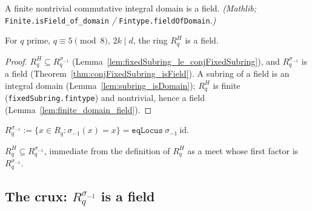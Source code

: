 \begin{lemma}\label{lem:finite_domain_field}
A finite nontrivial commutative integral domain is a field. \emph{(Mathlib;}
\texttt{Finite.isField\_of\_domain} \emph{/} \texttt{Fintype.fieldOfDomain}.\emph{)}
\end{lemma}

\begin{theorem}[$R_q^H$ is a field]\label{thm:fixedSubring_isField}
\leanok
{}
For $q$ prime, $q \equiv 5 \pmod 8$, $2k \mid d$, the ring $R_q^H$ is a field.
\end{theorem}

\begin{proof}
\leanok{}
$R_q^H \subseteq R_q^{\sigma_{-1}}$ (Lemma~\ref{lem:fixedSubring_le_conjFixedSubring}), and
$R_q^{\sigma_{-1}}$ is a field (Theorem~\ref{thm:conjFixedSubring_isField}). A subring of a field
is an integral domain (Lemma~\ref{lem:subring_isDomain}); $R_q^H$ is finite
(\texttt{fixedSubring.fintype}) and nontrivial, hence a field
(Lemma~\ref{lem:finite_domain_field}).
\end{proof}

\begin{definition}\label{def:conjFixedSubring}
\leanok
$R_q^{\sigma_{-1}} := \{x \in R_q : \sigma_{-1}(x) = x\} = \texttt{eqLocus}\ \sigma_{-1}\ \mathrm{id}$.
\end{definition}

\begin{lemma}[$R_q^H \le R_q^{\sigma_{-1}}$]\label{lem:fixedSubring_le_conjFixedSubring}
\leanok
{}
$R_q^H \subseteq R_q^{\sigma_{-1}}$, immediate from the definition of $R_q^H$ as a meet whose first
factor is $R_q^{\sigma_{-1}}$.
\end{lemma}

\subsection{The crux: \texorpdfstring{$R_q^{\sigma_{-1}}$}{R\_q\^{}σ(-1)} is a field}

